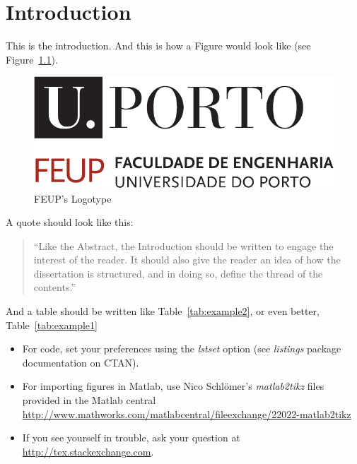\chapter{Introduction}
\label{chap:Intro}

This is the introduction.  And this is how a Figure would look like (see Figure~\ref{fig:FEUP_logo}).


\begin{figure}[t]
	\centering
		\includegraphics[scale=0.5]{Figures/uporto-feup.pdf} %
	\caption{FEUP's Logotype}
	\label{fig:FEUP_logo}
\end{figure}

A quote should look like this:

\begin{quote}
  ``Like the Abstract, the Introduction should be written to engage the
  interest of the reader. It should also give the reader an idea of
  how the dissertation is structured, and in doing so, define the
  thread of the contents.''~\citep[chap.\ Introduction]{kn:Tha01} 
\end{quote}

And a table should be written like Table~\ref{tab:example2}, or even better, Table~\ref{tab:example1}

\begin{itemize}
\item For code, set your preferences using the \emph{lstset} option (see \emph{listings} package documentation on CTAN).

\item For importing figures in Matlab, use Nico Schlömer's \emph{matlab2tikz} files provided in the Matlab central \url{http://www.mathworks.com/matlabcentral/fileexchange/22022-matlab2tikz}

\item If you see yourself in trouble, ask your question at \url{http://tex.stackexchange.com}.

\end{itemize}




